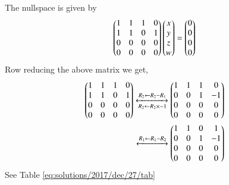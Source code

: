 The nullspace is given by 
\begin{align}
	\begin{pmatrix}1 & 1 & 1 & 0 \\ 1 & 1 & 0 & 1\\ 0 & 0 & 0 & 0\\0 & 0 & 0 & 0\end{pmatrix}\begin{pmatrix}x\\y\\z\\w\end{pmatrix} = \begin{pmatrix}0 \\ 0 \\ 0 \\ 0\end{pmatrix}
\end{align}	
Row reducing the above matrix we get,
\begin{align}
	\begin{pmatrix}1 & 1 & 1 & 0 \\ 1 & 1 & 0 & 1\\ 0 & 0 & 0 & 0\\0 & 0 & 0 & 0\end{pmatrix}
	\xleftrightarrow[R_2 \leftarrow R_2 \times -1]{R_2 \leftarrow R_2 - R_1}
	\begin{pmatrix}1 & 1 & 1 & 0 \\ 0 & 0 & 1 & -1\\ 0 & 0 & 0 & 0\\0 & 0 & 0 & 0\end{pmatrix}\\
	\xleftrightarrow{R_1 \leftarrow R_1- R_2}
	\begin{pmatrix}1 & 1 & 0 & 1 \\ 0 & 0 & 1 & -1\\ 0 & 0 & 0 & 0\\0 & 0 & 0 & 0\end{pmatrix} \label{eq:solutions/2017/dec/27/eq:rref}
\end{align}
See Table \ref{eq:solutions/2017/dec/27/tab}

